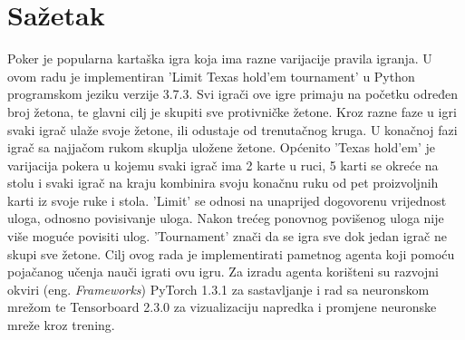 \section*{Sažetak}
\label{sec:summary}
Poker je popularna kartaška igra koja ima razne varijacije pravila igranja. U ovom radu je implementiran 'Limit Texas hold'em tournament' u Python programskom jeziku verzije 3.7.3. Svi igrači ove igre primaju na početku određen broj žetona, te glavni cilj je skupiti sve protivničke žetone. Kroz razne faze u igri svaki igrač ulaže svoje žetone, ili odustaje od trenutačnog kruga. U konačnoj fazi igrač sa najjačom rukom skuplja uložene žetone. Općenito 'Texas hold'em' je varijacija pokera u kojemu svaki igrač ima 2 karte u ruci, 5 karti se okreće na stolu i svaki igrač na kraju kombinira svoju konačnu ruku od pet proizvoljnih karti iz svoje ruke i stola. 'Limit' se odnosi na unaprijed dogovorenu vrijednost uloga, odnosno povisivanje uloga. Nakon trećeg ponovnog povišenog uloga nije više moguće povisiti ulog. 'Tournament' znači da se igra sve dok jedan igrač ne skupi sve žetone. Cilj ovog rada je implementirati pametnog agenta koji pomoću pojačanog učenja nauči igrati ovu igru. Za izradu agenta korišteni su razvojni okviri (eng. \textit{Frameworks}) PyTorch 1.3.1 za sastavljanje i rad sa neuronskom mrežom te Tensorboard 2.3.0 za vizualizaciju napredka i promjene neuronske mreže kroz trening.